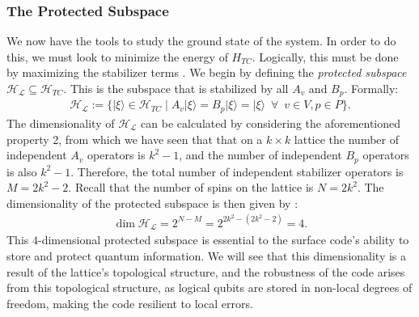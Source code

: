 \documentclass[12pt]{article}
\theoremstyle{definition}
\begin{document}
\subsubsection{The Protected Subspace}
We now have the tools to study the ground state of the system. In order to do this, we must look to minimize the energy of $H_{TC}$. Logically, this must be done by maximizing the stabilizer terms \cite{bravyi1998}. We begin by defining the \emph{protected subspace} $\mathcal{H_L} \subseteq \mathcal{H}_{TC}$. This is the subspace that is stabilized by all $A_v$ and $B_p$. Formally:
    \begin{align}
        \mathcal{H_L} := \{|\xi\rangle\in\mathcal{H}_{TC}\mid A_v|\xi\rangle = B_p|\xi\rangle = |\xi\rangle\enspace\forall\enspace v\in V, p\in P\}.
    \end{align}
The dimensionality of $\mathcal{H_L}$ can be calculated by considering the aforementioned property 2, from which we have seen that that on a $k\times k$ lattice the number of independent $A_v$ operators is $k^2-1$, and the number of independent $B_p$ operators is also $k^2-1$. Therefore, the total number of independent stabilizer operators is $M = 2k^2-2$. Recall that the number of spins on the lattice is $N = 2k^2$. The dimensionality of the protected subspace is then given by \cite{kitaev1997, kitaev2009, ellison2022}:
    \begin{align}
        \dim\mathcal{H_L} = 2^{N - M} = 2^{2k^2 - (2k^2 - 2)} = 4.
    \end{align}
This $4$-dimensional protected subspace is essential to the surface code's ability to store and protect quantum information. We will see that this dimensionality is a result of the lattice's topological structure, and the robustness of the code arises from this topological structure, as logical qubits are stored in non-local degrees of freedom, making the code resilient to local errors.
\end{document}
